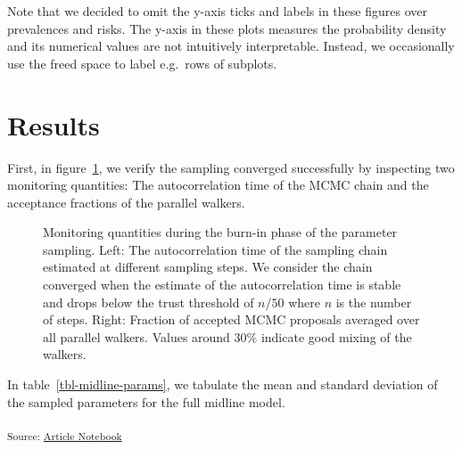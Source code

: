 \documentclass[
  sn-mathphys-num,
]{sn-jnl}
\begin{document}
Note that we decided to omit the y-axis ticks and labels in these
figures over prevalences and risks. The y-axis in these plots measures
the probability density and its numerical values are not intuitively
interpretable. Instead, we occasionally use the freed space to label
e.g.~rows of subplots.

\section{Results}\label{results}

First, in figure~\ref{fig-model-burnin-history}, we verify the sampling
converged successfully by inspecting two monitoring quantities: The
autocorrelation time of the MCMC chain and the acceptance fractions of
the parallel walkers.

\begin{figure}


\caption{\label{fig-model-burnin-history}Monitoring quantities during
the burn-in phase of the parameter sampling. Left: The autocorrelation
time of the sampling chain estimated at different sampling steps. We
consider the chain converged when the estimate of the autocorrelation
time is stable and drops below the trust threshold of \(n/50\) where
\(n\) is the number of steps. Right: Fraction of accepted MCMC proposals
averaged over all parallel walkers. Values around 30\% indicate good
mixing of the walkers.}

\end{figure}%

In table~\ref{tbl-midline-params}, we tabulate the mean and standard
deviation of the sampled parameters for the full midline model.

\textsubscript{Source:
\href{https://rmnldwg.github.io/bilateral-paper/manuscript-preview.html}{Article
Notebook}}
\end{document}

